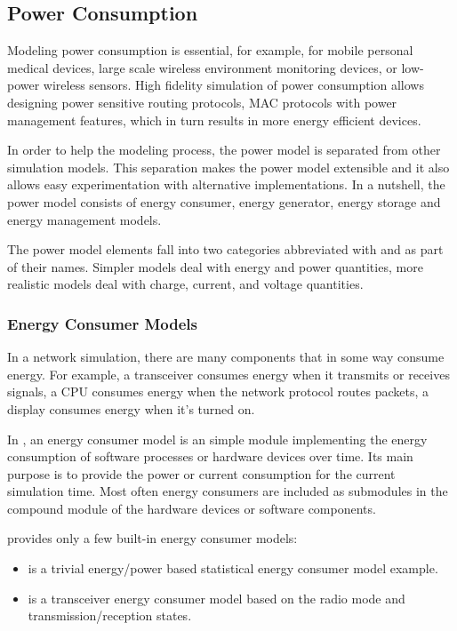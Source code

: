 \subsection{Power Consumption}
\label{subsec:power-consumption}
Modeling power consumption is essential, for example, for mobile personal medical devices, large scale wireless environment monitoring devices, or low-power wireless sensors. High fidelity simulation of power consumption allows designing power sensitive routing protocols, MAC protocols with power management features, which in turn results in more energy efficient devices.

In order to help the modeling process, the \inet power model is separated from other simulation models. This separation makes the power model extensible and it also allows easy experimentation with alternative implementations. In a nutshell, the power model consists of energy consumer, energy generator, energy storage and energy management models.

The power model elements fall into two categories abbreviated with  and  as part of their names. Simpler models deal with energy and power quantities, more realistic models deal with charge, current, and voltage quantities.

\subsubsection*{Energy Consumer Models}
In a network simulation, there are many components that in some way consume energy. For example, a transceiver consumes energy when it transmits or receives signals, a CPU consumes energy when the network protocol routes packets, a display consumes energy when it’s turned on.

In \inet, an energy consumer model is an \omnet simple module implementing the energy consumption of software processes or hardware devices over time. Its main purpose is to provide the power or current consumption for the current simulation time. Most often energy consumers are included as submodules in the compound module of the hardware devices or software components.

\inet provides only a few built-in energy consumer models:

\begin{itemize}
        \item {} is a trivial energy/power based statistical energy consumer model example.
        \item {} is a transceiver energy consumer model based on the radio mode and transmission/reception states.
\end{itemize}

